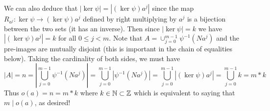 \documentclass[11pt]{article}
\begin{document}
\begin{exercise}{88}{6}
{        We can also deduce that $| \ker \psi | = | (\ker \psi) a^j |$ since the map $R_{a^j}: \ker \psi \to (\ker \psi) a^j$ defined by right multiplying by $a^j$ is a bijection between the two sets (it has an inverse).
        Then since $|\ker \psi| = k$ we have $| (\ker \psi) a^j | = k$ for all $0 \leq j < m$.
        Note that $A = \cup _{j=0}^{m-1} \psi ^{-1} (Na^j)$ and the pre-images are mutually disjoint (this is important in the chain of equalities below).
        Taking the cardinality of both sides, we must have
        $$|A| = n = \left| \bigcup _{j=0}^{m-1} \psi ^{-1} (Na^j) \right| = \bigcup _{j=0}^{m-1} \left| \psi ^{-1} (Na^j) \right| = \bigcup _{j=0}^{m-1} |(\ker \psi) a^j | = \bigcup _{j=0}^{m-1} k = m*k $$
        Thus $o(a) = n = m*k$ where $k \in \mathbb{N} \subset \mathbb{Z}$ which is equivalent to saying that $m \mid o(a)$, as desired!
    }
\end{exercise}
\end{document}
